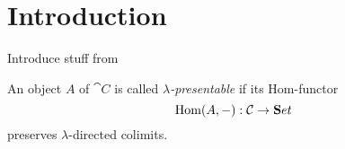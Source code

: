 \section{Introduction}

Introduce stuff from \cite{AdamekRosicky}

\begin{Definition}
An object $A$ of $\cat C$ is called \emph{$\lambda$-presentable} if its Hom-functor
\[ \textrm{Hom}(A,-) : \mathcal{C} \to \mathbf{S}et \]
preserves $\lambda$-directed colimits. 
\end{Definition}